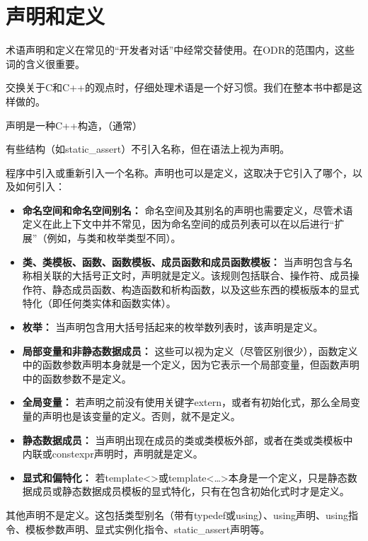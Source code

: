 \section{声明和定义}
术语声明和定义在常见的“开发者对话”中经常交替使用。在ODR的范围内，这些词的含义很重要。

\begin{notice}
交换关于C和C++的观点时，仔细处理术语是一个好习惯。我们在整本书中都是这样做的。
\end{notice}

声明是一种C++构造，（通常）

\begin{notice}
有些结构（如static\_assert）不引入名称，但在语法上视为声明。
\end{notice}

程序中引入或重新引入一个名称。声明也可以是定义，这取决于它引入了哪个，以及如何引入：

\begin{itemize}
\item 
\textbf{命名空间和命名空间别名：}
命名空间及其别名的声明也需要定义，尽管术语定义在此上下文中并不常见，因为命名空间的成员列表可以在以后进行“扩展”（例如，与类和枚举类型不同）。

\item 
\textbf{类、类模板、函数、函数模板、成员函数和成员函数模板： }
当声明包含与名称相关联的大括号正文时，声明就是定义。该规则包括联合、操作符、成员操作符、静态成员函数、构造函数和析构函数，以及这些东西的模板版本的显式特化（即任何类实体和函数实体）。

\item 
\textbf{枚举：}
当声明包含用大括号括起来的枚举数列表时，该声明是定义。

\item 
\textbf{局部变量和非静态数据成员：}
这些可以视为定义（尽管区别很少），函数定义中的函数参数声明本身就是一个定义，因为它表示一个局部变量，但函数声明中的函数参数不是定义。

\item 
\textbf{全局变量：}
若声明之前没有使用关键字extern，或者有初始化式，那么全局变量的声明也是该变量的定义。否则，就不是定义。

\item 
\textbf{静态数据成员： }
当声明出现在成员的类或类模板外部，或者在类或类模板中内联或constexpr声明时，声明就是定义。

\item 
\textbf{显式和偏特化：}
若template<>或template<…>本身是一个定义，只是静态数据成员或静态数据成员模板的显式特化，只有在包含初始化式时才是定义。

\end{itemize}

其他声明不是定义。这包括类型别名（带有typedef或using）、using声明、using指令、模板参数声明、显式实例化指令、static\_assert声明等。






